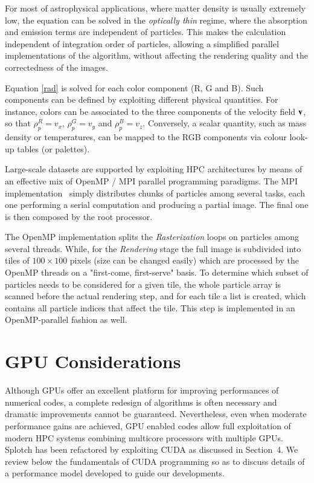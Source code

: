 \documentclass[1p]{elsarticle}
\begin{document}
\begin{itemize}
For most of astrophysical applications, where matter density is usually extremely low, the equation can be solved in the {\it optically thin} regime, where the absorption and emission terms are independent of particles. 
This makes the calculation independent of integration order of particles, allowing a simplified parallel implementations of the algorithm, without affecting the rendering quality and the correctedness of the images. 

Equation \eqref{rad} is solved for each color component (R, G and B). Such components can be defined by exploiting different physical quantities. For instance, colors  can be associated to the three components of the velocity field $\bf v$, so that 
$\rho_p^{R}=v_x$, $\rho_p^{G}=v_y$ and $\rho_p^{B}=v_z$. Conversely, a scalar quantity, such as mass density or temperatures, can be mapped to the RGB components via colour look-up tables (or palettes). 
\end{itemize}
Large-scale datasets are supported by exploiting HPC architectures by means of an effective mix of OpenMP / MPI parallel programming paradigms. The MPI implementation~\cite{jin:high-performance}  simply distributes chunks of particles among several tasks, each one performing a serial computation and producing a partial image. The final one is then composed by the root processor.  
 
The OpenMP implementation splits the {\it Rasterization} loops on particles among several threads. While, for the {\it Rendering} stage the full image is subdivided into tiles of $100 \times 100$ pixels (size can be changed easily) which are processed by the OpenMP threads on a "first-come, first-serve" basis. To determine which subset of particles needs to be considered for a given tile, the whole particle array is scanned before the actual rendering step, and for each tile a list is created, which contains all particle indices that affect the tile. This step is implemented in an OpenMP-parallel fashion as well.


\section{GPU Considerations}
\label{sec:gpu-code}
Although GPUs offer an excellent platform for improving performances of numerical codes, a complete redesign of algorithms is often necessary and dramatic improvements cannot be guaranteed. Nevertheless, even when moderate performance gains are achieved, GPU enabled codes allow full exploitation of modern HPC systems combining multicore processors with multiple GPUs. Splotch has been refactored by exploiting CUDA as discussed in Section~4. We review below the fundamentals of CUDA programming so as to discuss details of a performance model developed to guide our developments.
\end{document}
